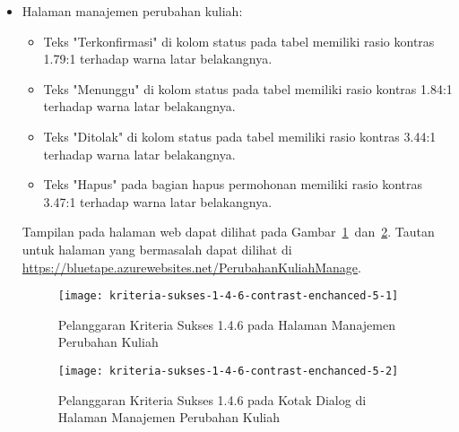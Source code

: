\begin{itemize}
    \item Halaman manajemen perubahan kuliah: 
    \begin{itemize}
        \item Teks "Terkonfirmasi" di kolom status pada tabel memiliki rasio kontras 1.79:1 terhadap warna latar belakangnya.
        \item Teks "Menunggu" di kolom status pada tabel memiliki rasio kontras 1.84:1 terhadap warna latar belakangnya.
        \item Teks "Ditolak" di kolom status pada tabel memiliki rasio kontras 3.44:1 terhadap warna latar belakangnya.
        \item Teks "Hapus" pada bagian hapus permohonan memiliki rasio kontras 3.47:1 terhadap warna latar belakangnya.
    \end{itemize}
    Tampilan pada halaman web dapat dilihat pada \mbox{Gambar \ref{fig:1.4.6_contrast_enchanced_5_1} dan \ref{fig:1.4.6_contrast_enchanced_5_2}}. Tautan untuk halaman yang bermasalah dapat dilihat di \url{https://bluetape.azurewebsites.net/PerubahanKuliahManage}.
    \begin{figure}[H]
        \centering  
        \texttt{[image: kriteria-sukses-1-4-6-contrast-enchanced-5-1]}  
        \caption[Pelanggaran Kriteria Sukses 1.4.6 pada Halaman Manajemen Perubahan Kuliah]{Pelanggaran Kriteria Sukses 1.4.6 pada Halaman Manajemen Perubahan Kuliah}
        \label{fig:1.4.6_contrast_enchanced_5_1}  
    \end{figure} 
    
    \begin{figure}[H]
        \centering  
        \texttt{[image: kriteria-sukses-1-4-6-contrast-enchanced-5-2]}  
        \caption[Pelanggaran Kriteria Sukses 1.4.6 pada Kotak Dialog di Halaman Manajemen Perubahan Kuliah]{Pelanggaran Kriteria Sukses 1.4.6 pada Kotak Dialog di Halaman Manajemen Perubahan Kuliah}
        \label{fig:1.4.6_contrast_enchanced_5_2}  
    \end{figure}


\end{itemize}
